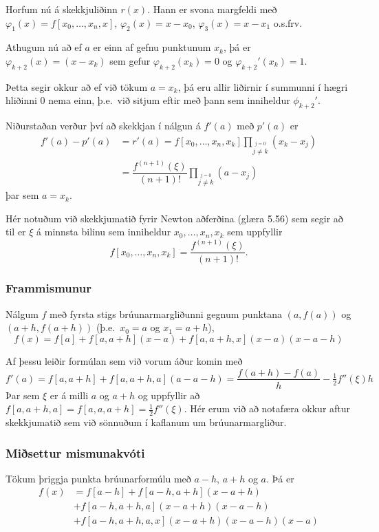\documentclass[icelandic,a4paper,12pt]{article}
\begin{document}
\pause
\smallskip
Horfum nú á skekkjuliðinn $r(x)$.  Hann er svona margfeldi með 
$\varphi_1(x)=f[x_0,\dots,x_n,x]$, $\varphi_2(x)=x-x_0$,
$\varphi_3(x)=x-x_1$ o.s.frv.

\pause
\smallskip
Athugum nú að ef $a$ er einn af gefnu punktunum $x_k$, þá er 
$\varphi_{k+2}(x)=(x-x_k)$ sem gefur $\varphi_{k+2}(x_k)=0$ og
$\varphi_{k+2}'(x_k)=1$.  

\smallskip
Þetta segir okkur að ef við tökum $a=x_k$, þá 
eru allir liðirnir í summunni í hægri hliðinni $0$ nema 
einn, þ.e.~við sitjum eftir með þann sem inniheldur $\phi_{k+2}'$.



Niðurstaðan verður því að skekkjan í nálgun á $f'(a)$ með $p'(a)$ er
\begin{align*}
  f'(a) - p'(a) &= r'(a)
=f[x_0,\dots,x_n,x_k]
\prod_{\stackrel{j=0}{j \not= k}} (x_k-x_j)\\
&=\dfrac{f^{(n+1)}(\xi)}{(n+1)!}
  \prod_{\stackrel{j=0}{j \not= k}} (a-x_j)
\end{align*}
þar sem $a=x_k$.

\pause
\smallskip
Hér notuðum við skekkjumatið fyrir Newton aðferðina (glæra 5.56) sem segir að 
til er $\xi$ á minnsta bilinu sem inniheldur $x_0,\ldots,x_n,x_k$ sem uppfyllir
$$
  f[x_0,\ldots,x_n,x_k] = \frac{f^{(n+1)}(\xi)}{(n+1)!}.
$$



\subsubsection{Frammismunur} 
Nálgum $f$ með fyrsta stigs
brúunarmargliðunni gegnum punktana $(a,f(a))$ og $(a+h,f(a+h))$
(þ.e.~$x_0 = a$ og $x_1 = a+h$),
$$
  f(x)=f[a]+f[a,a+h](x-a)+f[a,a+h,x](x-a)(x-a-h)
$$ 

\pause
\smallskip
Af þessu leiðir formúlan sem við vorum áður komin með
$$
  f'(a)=f[a,a+h]+f[a,a+h,a](a-a-h)
  =\dfrac{f(a+h)-f(a)}h-\tfrac 12 f''(\xi)h
$$ 
Þar sem $\xi$ er á milli 
$a$ og $a+h$ og uppfyllir að $f[a,a+h,a]=f[a,a,a+h]=\tfrac 12f''(\xi)$.
Hér erum við að notafæra okkur aftur skekkjumatið sem við sönnuðum  í kaflanum
um brúunarmargliður.



\subsubsection{Miðsettur mismunakvóti} 
Tökum þriggja punkta brúunarformúlu með $a-h$, $a+h$ og
$a$.  Þá er
\begin{align*}
  f(x)&=f[a-h]+f[a-h,a+h](x-a+h)\\
  &+f[a-h,a+h,a](x-a+h)(x-a-h)\\
  &+f[a-h,a+h,a,x](x-a+h)(x-a-h)(x-a)
\end{align*}
\end{document}
